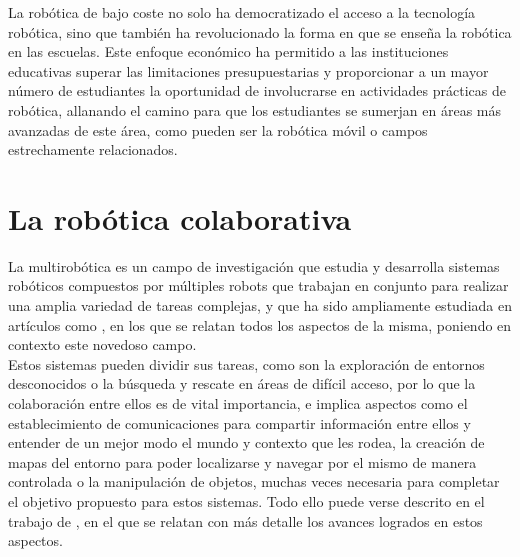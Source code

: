 La robótica de bajo coste no solo ha democratizado el acceso a la tecnología
robótica, sino que también ha revolucionado la forma en que se enseña la
robótica en las escuelas.
Este enfoque económico ha permitido a las instituciones educativas superar las
limitaciones presupuestarias y proporcionar a un mayor número de estudiantes la
oportunidad de involucrarse en actividades prácticas de robótica, allanando el
camino para que los estudiantes se sumerjan en áreas más avanzadas de este área,
como pueden ser la robótica móvil o campos estrechamente relacionados.



\section{La robótica colaborativa}
\label{sec:robotica_colaborativa} %


La multirobótica es un campo de investigación que estudia y desarrolla sistemas
robóticos compuestos por múltiples robots que trabajan en conjunto para realizar
una amplia variedad de tareas complejas, y que ha sido ampliamente estudiada en
artículos como \cite{Verma2021}, en los que se relatan todos los aspectos de la
misma, poniendo en contexto este novedoso campo.
\\

Estos sistemas pueden dividir sus tareas, como son la exploración de entornos
desconocidos o la búsqueda y rescate en áreas de difícil acceso, por lo que la
colaboración entre ellos es de vital importancia, e implica aspectos como el
establecimiento de comunicaciones para compartir información entre ellos y
entender de un mejor modo el mundo y contexto que les rodea, la creación de
mapas del entorno para poder localizarse y navegar por el mismo de manera
controlada o la manipulación de objetos, muchas veces necesaria para completar
el objetivo propuesto para estos sistemas.
Todo ello puede verse descrito en el trabajo de \cite{Parker2003}, en el que se
relatan con más detalle los avances logrados en estos aspectos.
\\

